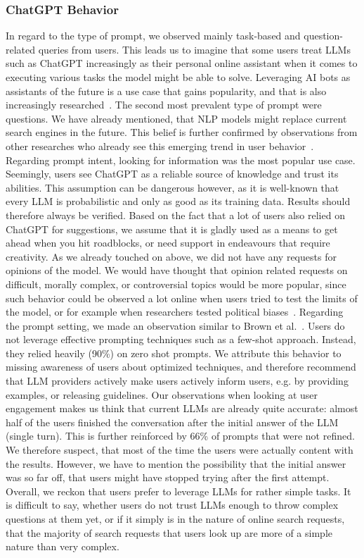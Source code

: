 \subsubsection{ChatGPT Behavior}
In regard to the type of prompt, we observed mainly task-based and question-related queries from
users.
This leads us to imagine that some users treat LLMs such as ChatGPT increasingly as their
personal online assistant when it comes to executing various tasks the model might be able to solve.
Leveraging AI bots as assistants of the future is a use case that gains popularity, and that is also
increasingly researched~\cite{eshghie_chatgpt_2023}.
The second most prevalent type of prompt were questions.
We have already mentioned, that NLP models might replace current search engines in the future.
This belief is further confirmed by observations from other researches who already see this
emerging trend in user behavior~\cite{van_bulck_what_2023}.
Regarding prompt intent, looking for information was the most popular use case.
Seemingly, users see ChatGPT as a reliable source of knowledge and trust its abilities.
This assumption can be dangerous however, as it is well-known that every LLM is probabilistic and
only as good as its training data.
Results should therefore always be verified.
Based on the fact that a lot of users also relied on ChatGPT for suggestions, we assume that it
is gladly used as a means to get ahead when you hit roadblocks, or need support in endeavours
that require creativity.
As we already touched on above, we did not have any requests for opinions of the model.
We would have thought that opinion related requests on difficult, morally complex, or
controversial topics would be more popular, since such behavior could be observed a lot online when
users tried to test the limits of the model, or for example when researchers tested political
biases~\cite{rozado_political_2023}.
Regarding the prompt setting, we made an observation similar to Brown et al.~\cite{
    brown_language_2020}.
Users do not leverage effective prompting techniques such as a few-shot approach.
Instead, they relied heavily (90\%) on zero shot prompts.
We attribute this behavior to missing awareness of users about optimized techniques, and
therefore recommend that LLM providers actively make users actively inform users, e.g. by
providing examples, or releasing guidelines.
Our observations when looking at user engagement makes us think that current LLMs are already
quite accurate: almost half of the users finished the conversation after the initial answer of
the LLM (single turn).
This is further reinforced by 66\% of prompts that were not refined.
We therefore suspect, that most of the time the users were actually content with the results.
However, we have to mention the possibility that the initial answer was so far off,
that users might have stopped trying after the first attempt.
Overall, we reckon that users prefer to leverage LLMs for rather simple tasks.
It is difficult to say, whether users do not trust LLMs enough to throw complex questions at
them yet, or if it simply is in the nature of online search requests, that the majority of search
requests that users look up are more of a simple nature than very complex.



